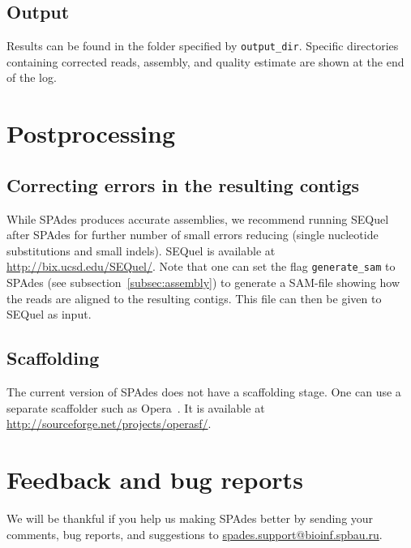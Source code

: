 \documentclass{article}
\def\spades{SPAdes}
\begin{document}
\subsection{Output}
Results can be found in the folder specified by {\tt output\_dir}.
Specific directories containing corrected reads, assembly, and quality estimate are shown at the end of the log.

\section{Postprocessing}

\subsection{Correcting errors in the resulting contigs}
While {\spades} produces accurate assemblies, 
we recommend running SEQuel~\cite{sequel} after {\spades} for further number of small errors reducing 
(single nucleotide substitutions and small indels). SEQuel is available at
\url{http://bix.ucsd.edu/SEQuel/}. Note that one can set the flag {\tt generate\_sam} to {\spades}
(see subsection~\ref{subsec:assembly}) to generate a SAM-file showing how the 
reads are aligned to the resulting contigs. This file can then be given to SEQuel as input.

\subsection{Scaffolding}
The current version of {\spades} does not have a scaffolding stage.
One can use a separate scaffolder such as Opera~\cite{opera}.
It is available at \url{http://sourceforge.net/projects/operasf/}.

\section{Feedback and bug reports}
We will be thankful if you help us making {\spades} better
by sending your comments, bug reports, and suggestions to
\url{spades.support@bioinf.spbau.ru}.




\end{document}
